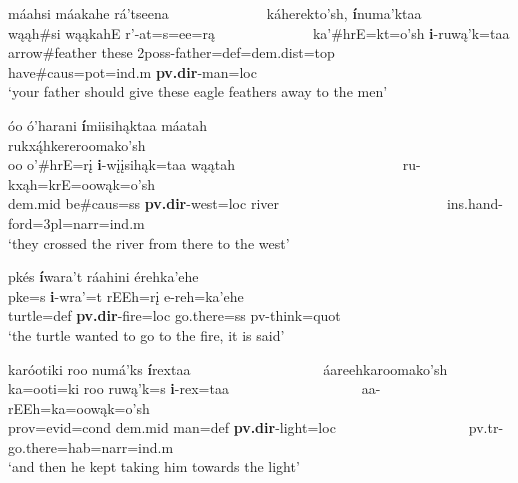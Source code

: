 \begin{exe}
\begin{xlist}
\item \glll máahsi máakahe rá'tseena ~ ~ ~ ~ ~ ~ ~ ~ káherekto'sh, \textbf{í}numa'ktaa\\
	wąąh\#si wąąkahE r'-at=s=ee=rą ~ ~ ~ ~ ~ ~ ~ ~ ka'\#hrE=kt=o'sh \textbf{i}-ruwą'k=taa\\
	\textnormal{arrow}\#\textnormal{feather} \textnormal{these} 2poss-\textnormal{father}=def=dem.dist=top ~ ~ ~ ~ ~ ~ ~ ~  \textnormal{have}\#caus=pot=ind.m \textbf{pv.dir}-\textnormal{man}=loc\\
	\glt `your father should give these eagle feathers away to the men' \citep[226]{hollow1973b}
	
\item \glll óo ó'harani \textbf{í}miisihąktaa máatah ~ ~ ~ ~ ~ ~ ~ ~ ~ ~ ~ ~ ~ ~ rukxą́hkereroomako'sh\\
	oo o'\#hrE=rį \textbf{i}-wįįsihąk=taa wąątah ~ ~ ~ ~ ~ ~ ~ ~ ~ ~ ~ ~ ~ ~ ru-kxąh=krE=oowąk=o'sh\\
	dem.mid \textnormal{be}\#caus=ss \textbf{pv.dir}-\textnormal{west}=loc \textnormal{river} ~ ~ ~ ~ ~ ~ ~ ~ ~ ~ ~ ~ ~ ~  ins.hand-\textnormal{ford}=3pl=narr=ind.m\\
	\glt `they crossed the river from there to the west' \citep[253]{hollow1973b}
	
\item \glll pkés \textbf{í}wara't ráahini érehka'ehe\\
	pke=s \textbf{i}-wra'=t rEEh=rį e-reh=ka'ehe\\
	\textnormal{turtle}=def \textbf{pv.dir}-\textnormal{fire}=loc \textnormal{go.there}=ss pv-\textnormal{think}=quot\\
	\glt `the turtle wanted to go to the fire, it is said' \citep[167]{hollow1973b}
	
\item \glll karóotiki roo numá'ks \textbf{í}rextaa ~ ~ ~ ~ ~ ~ ~ ~ ~ ~ ~ áareehkaroomako'sh\\
	ka=ooti=ki roo ruwą'k=s \textbf{i}-rex=taa ~ ~ ~ ~ ~ ~ ~ ~ ~ ~ ~ aa-rEEh=ka=oowąk=o'sh\\
	prov=evid=cond dem.mid \textnormal{man}=def  \textbf{pv.dir}-\textnormal{light}=loc ~ ~ ~ ~ ~ ~ ~ ~ ~ ~ ~ pv.tr-\textnormal{go.there}=hab=narr=ind.m\\
	\glt 	`and then he kept taking him towards the light' \citep[95]{hollow1973b}

\end{xlist}

\end{exe}

